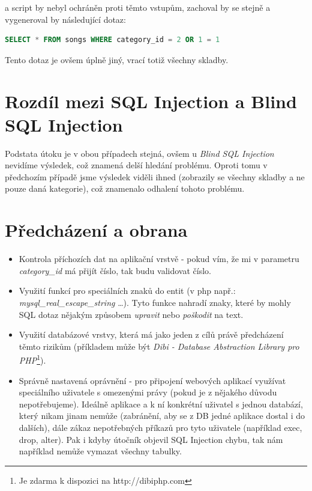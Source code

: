 \documentclass[12pt, a4paper]{report}
\begin{document}
a script by nebyl ochráněn proti těmto  vstupům, zachoval by se stejně a vygeneroval by následující dotaz:
\begin{lstlisting}[label=web_app_url_4,language=SQL, caption=Vygenerovaný SQL dotaz z upraveného URL]
SELECT * FROM songs WHERE category_id = 2 OR 1 = 1
\end{lstlisting}

Tento dotaz je ovšem úplně jiný, vrací totiž všechny skladby.

\section{Rozdíl mezi SQL Injection a Blind SQL Injection}
Podstata útoku je v obou případech stejná, ovšem u \textit{Blind SQL Injection} nevidíme výsledek, což znamená delší hledání problému. Oproti tomu v předchozím případě jsme výsledek viděli ihned (zobrazily se všechny skladby a ne pouze daná kategorie), což znamenalo odhalení tohoto problému. 

\section{Předcházení a obrana}
\begin{itemize}
\item Kontrola příchozích dat na aplikační vrstvě - pokud vím, že mi v parametru \textit{category\_id} má přijít číslo, tak budu validovat číslo.
\item Využití funkcí pro  speciálních znaků do entit (v php např.: \textit{mysql\_real\_escape\_string} \ldots). Tyto funkce nahradí znaky, které by mohly SQL dotaz nějakým způsobem \textit{upravit} nebo \textit{poškodit} na text.
\item Využití databázové vrstvy, která má jako jeden z cílů právě předcházení těmto rizikům (příkladem může být \textit{Dibi - Database Abstraction Library pro PHP}\footnote{Je zdarma k dispozici na http://dibiphp.com}).
\item Správně nastavená oprávnění - pro připojení webových aplikací využívat speciálního uživatele s omezenými právy (pokud je z nějakého důvodu nepotřebujeme). Ideálně aplikace a k ní konkrétní uživatel s jednou databází, který nikam jinam nemůže (zabránění, aby se z DB jedné aplikace dostal i do dalších), dále zákaz nepotřebných příkazů pro tyto uživatele (například exec, drop, alter). Pak i kdyby útočník objevil SQL Injection chybu, tak nám například nemůže vymazat všechny tabulky.
\end{itemize}
\end{document}
